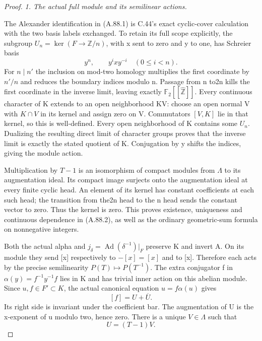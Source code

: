 \begin{proof}
\emph{1. The actual full module and its semilinear actions.}\par
The Alexander identification in (A.88.1) is C.44's exact cyclic-cover
calculation with the two basis labels exchanged. To retain its full
scope explicitly, the subgroup
\(U_n=\ker(F\to\mathbb Z/n)\), with x sent to zero and y to one,
has Schreier basis
\[
                   y^n,\qquad y^i x y^{-i}\quad(0\leq i<n).
\]
For \(n\mid n'\) the inclusion on mod-two homology multiplies the
first coordinate by \(n'/n\) and reduces the boundary indices
modulo n. Passage from n to2n kills the first coordinate in the
inverse limit, leaving exactly \(\mathbb F_2[[\widehat{\mathbb Z}]]\).
Every continuous character of K extends to an open neighborhood KV:
choose an open normal V with \(K\cap V\) in its kernel and assign
zero on V. Commutators \([V,K]\) lie in that kernel, so this is
well-defined. Every open neighborhood of K contains some \(U_n\).
Dualizing the resulting direct limit of character groups proves
that the inverse limit is exactly the stated quotient of K.
Conjugation by y shifts the indices, giving the module action.

Multiplication by \(T-1\) is an isomorphism of compact modules
from \(\Lambda\) to its augmentation ideal. Its compact image
surjects onto the augmentation ideal at every finite cyclic head.
An element of its kernel has constant coefficients at each such
head; the transition from the2n head to the n head sends the
constant vector to zero. Thus the kernel is zero. This proves
existence, uniqueness and continuous dependence in (A.88.2), as
well as the ordinary geometric-sum formula on nonnegative integers.

Both the actual alpha and \(j_\delta=\operatorname{Ad}(\delta^{-1})|_F\)
preserve K and invert A. On its module they send [x] respectively
to \(-[x]=[x]\) and to [x]. Therefore each acts by the precise
semilinearity \(P(T)\mapsto P(T^{-1})\). The extra conjugator f
in \(\alpha(y)=f^{-1}y^{-1}f\) lies in K and has trivial inner
action on this abelian module. Since \(u,f\in F'\subset K\), the
actual canonical equation \(u=f\alpha(u)\) gives
\[
                          [f]=U+\overline U.
 \tag{A.88.7}
\]
Its right side is invariant under the coefficient bar. The
augmentation of U is the x-exponent of u modulo two, hence zero.
There is a unique \(V\in\Lambda\) such that
\[
                              U=(T-1)V.
 \tag{A.88.8}
\]


\end{proof}
